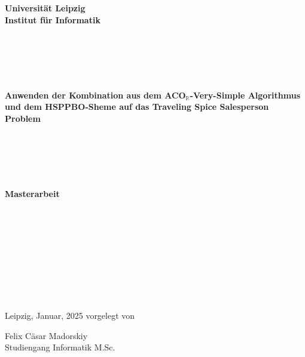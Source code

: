 \begin{titlepage}
	
	\begin{center}
		
		\fontsize{14pt}{12pt}
		
		\textbf{Universität Leipzig}\\
		\textbf{Institut für Informatik}\\
		
	\end{center}
	
	\begin{verbatim}
		
		
		
		
	\end{verbatim}
	
	\begin{center}
		
		\fontsize{14pt}{12pt}
		
		\textbf{Anwenden der Kombination aus dem ACO\(_\mathbb{R}\)-Very-Simple Algorithmus und dem HSPPBO-Sheme auf das Traveling Spice Salesperson Problem}
		
	\end{center}
	
	\begin{verbatim}
		
		
		
		
	\end{verbatim}
	
	\begin{center}
		
		\fontsize{18pt}{12pt}
		
		\textbf{Masterarbeit}
		
	\end{center}
	
	\begin{verbatim}
		
		
		
		
		
		
		
		
	\end{verbatim}
	
	\begin{flushright}
		
		Leipzig, Januar, 2025 \hfill vorgelegt von\\
		
		\bigskip
		
		Felix Cäsar Madorskiy\\
		Studiengang Informatik M.Sc.
		

\end{flushright}
\end{titlepage}
